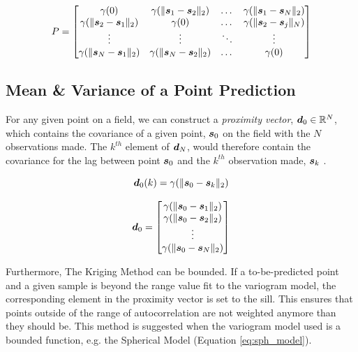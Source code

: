 \begin{equation}
    P = \begin{bmatrix} 

    \gamma(0) & \gamma(\| {\it{\boldsymbol{s}}}_1 - {\it{\boldsymbol{s}}}_2 \|_2) & \dots & \gamma(\| {\it{\boldsymbol{s}}}_1 - {\it{\boldsymbol{s}}}_N \|_2)\\
    
    \gamma(\| {\it{\boldsymbol{s}}}_2 - {\it{\boldsymbol{s}}}_1 \|_2) & \gamma(0) & \dots & \gamma(\| {\it{\boldsymbol{s}}}_2 - {\it{\boldsymbol{s}}}_j \|_N)\\

    \vdots & \vdots & \ddots & \vdots \\
    
    \gamma(\| {\it{\boldsymbol{s}}}_N - {\it{\boldsymbol{s}}}_1 \|_2) & \gamma(\| {\it{\boldsymbol{s}}}_N - {\it{\boldsymbol{s}}}_2 \|_2) & \dots & \gamma(0)\\

    \end{bmatrix}
    \label{eq:covvarmat}
\end{equation}

\subsection{Mean \& Variance of a Point Prediction}
For any given point on a field, we can construct a \textit{proximity vector}, ${\it{\boldsymbol{d}}}_0 \in \mathbb{R}^{N}$, which contains the covariance of a given point, ${\it{\boldsymbol{s}}}_0$ on the field with the $N$ observations made. The $k^{th}$ element of ${\it{\boldsymbol{d}}}_N$, would therefore contain the covariance for the lag between point ${\it{\boldsymbol{s}}}_0$ and the $k^{th}$ observation made, ${\it{\boldsymbol{s}}}_k$ \cite{matheron:geostat}.

$${\it{\boldsymbol{d}}}_0(k) = \gamma(\| {\it{\boldsymbol{s}}}_0 - {\it{\boldsymbol{s}}}_k \|_2)$$

\begin{equation}
    {\it{\boldsymbol{d}}}_0 =
        \begin{bmatrix} 
                    \gamma(\| {\it{\boldsymbol{s}}}_0 - {\it{\boldsymbol{s}}}_1 \|_2) \\
                    \gamma(\| {\it{\boldsymbol{s}}}_0 - {\it{\boldsymbol{s}}}_2 \|_2) \\
                     \vdots \\
                    \gamma(\| {\it{\boldsymbol{s}}}_0 - {\it{\boldsymbol{s}}}_N \|_2) \\
        \end{bmatrix} 
    \label{eq:proxvect}
\end{equation}

\noindent Furthermore, The Kriging Method can be bounded. If a to-be-predicted point and a given sample is beyond the range value fit to the variogram model, the corresponding element in the proximity vector is set to the sill. This ensures that points outside of the range of autocorrelation are not weighted anymore than they should be. This method is suggested when the variogram model used is a bounded function, e.g. the Spherical Model (Equation \ref{eq:sph_model}).

